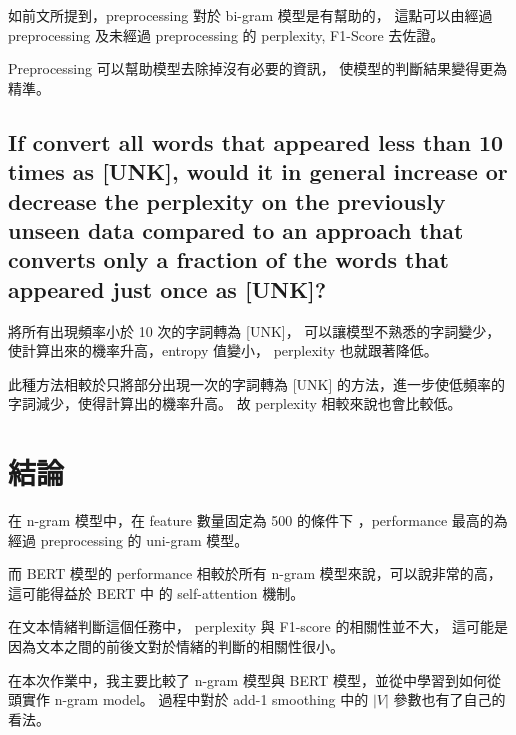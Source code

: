 \documentclass{article}[12pt]
\begin{document}
如前文所提到，preprocessing 對於 bi-gram 模型是有幫助的，
這點可以由經過 preprocessing 及未經過 preprocessing 的 perplexity, F1-Score 去佐證。

Preprocessing 可以幫助模型去除掉沒有必要的資訊，
使模型的判斷結果變得更為精準。

\subsection{If convert all words that appeared less than 10 times as [UNK], would it in general
increase or decrease the perplexity on the previously unseen data
compared to an approach that converts only a fraction of the words that
appeared just once as [UNK]?}

將所有出現頻率小於 10 次的字詞轉為 [UNK]， 可以讓模型不熟悉的字詞變少，使計算出來的機率升高，entropy 值變小，
perplexity 也就跟著降低。

此種方法相較於只將部分出現一次的字詞轉為 [UNK] 的方法，進一步使低頻率的字詞減少，使得計算出的機率升高。
故 perplexity 相較來說也會比較低。


\section{結論}

在 n-gram 模型中，在 feature 數量固定為 500 的條件下
，performance 最高的為經過 preprocessing 的 uni-gram 模型。

而 BERT 模型的 performance 相較於所有 n-gram 模型來說，可以說非常的高，這可能得益於 BERT 中
的 self-attention 機制。

在文本情緒判斷這個任務中， perplexity 與 F1-score 的相關性並不大，
這可能是因為文本之間的前後文對於情緒的判斷的相關性很小。

在本次作業中，我主要比較了 n-gram 模型與 BERT 模型，並從中學習到如何從頭實作 n-gram model。
過程中對於 add-1 smoothing 中的 $|V|$ 參數也有了自己的看法。
\end{document}

